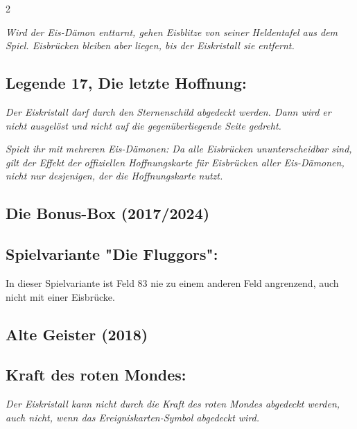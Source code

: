 \documentclass[10pt, a4paper, oneside]{book}
\newcommand{\fan}[1]{\textit{#1}}
\begin{document}
\begin{multicols*}{2}
\begin{bgcolor}
\fan{Wird der Eis-Dämon enttarnt, gehen Eisblitze von seiner Heldentafel aus dem Spiel. Eisbrücken bleiben aber liegen, bis der Eiskristall sie entfernt.}



\subsection{Legende 17, Die letzte Hoffnung:}

\fan{Der Eiskristall darf durch den Sternenschild abgedeckt werden. Dann wird er nicht ausgelöst und nicht auf die gegenüberliegende Seite gedreht.}

\fan{Spielt ihr mit mehreren Eis-Dämonen: Da alle Eisbrücken ununterscheidbar sind, gilt der Effekt der offiziellen Hoffnungskarte für Eisbrücken aller Eis-Dämonen, nicht nur desjenigen, der die Hoffnungskarte nutzt.}


\end{bgcolor}






\begin{bgcolor}[color-bb]
\section{Die Bonus-Box (2017/2024)}

\subsection{Spielvariante "Die Fluggors":}

In dieser Spielvariante ist Feld 83 nie zu einem anderen Feld angrenzend, auch nicht mit einer Eisbrücke.
\supercite{88779}

\end{bgcolor}


\begin{bgcolor}[color-ag]
\section{Alte Geister (2018)}


\subsection{Kraft des roten Mondes:}

\fan{Der Eiskristall kann nicht durch die Kraft des roten Mondes abgedeckt werden, auch nicht, wenn das Ereigniskarten-Symbol abgedeckt wird.}


\end{bgcolor}
\end{multicols*}
\end{document}
